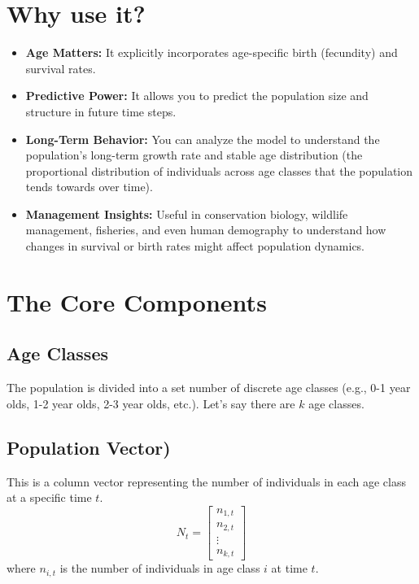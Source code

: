\documentclass{article}
\begin{document}
\section{Why use it?}

\begin{itemize}
    \item \textbf{Age Matters:} It explicitly incorporates age-specific birth (fecundity) and survival rates.
    \item \textbf{Predictive Power:} It allows you to predict the population size and structure in future time steps.
    \item \textbf{Long-Term Behavior:} You can analyze the model to understand the population's long-term growth rate and stable age distribution (the proportional distribution of individuals across age classes that the population tends towards over time).
    \item \textbf{Management Insights:} Useful in conservation biology, wildlife management, fisheries, and even human demography to understand how changes in survival or birth rates might affect population dynamics.
\end{itemize}

\section{The Core Components}

\subsection{Age Classes}
The population is divided into a set number of discrete age classes (e.g., 0-1 year olds, 1-2 year olds, 2-3 year olds, etc.). Let's say there are $k$ age classes.

\subsection{Population Vector)}
This is a column vector representing the number of individuals in each age class at a specific time $t$.
\[
N_t = \begin{bmatrix} n_{1,t} \\ n_{2,t} \\ \vdots \\ n_{k,t} \end{bmatrix}
\]
where $n_{i,t}$ is the number of individuals in age class $i$ at time $t$.
\end{document}
